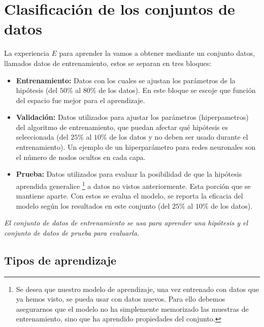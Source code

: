 \section{Clasificación de los conjuntos de datos}

La experiencia \(E\) para aprender la vamos a obtener mediante un conjunto datos, llamados datos de entrenamiento, estos se separan en tres bloques:

\begin{itemize}
 \item \textbf{Entrenamiento:} Datos con los cuales se ajustan los parámetros de la hipótesis (del \(50\%\) al \(80\%\) de los datos). En este bloque se escoje que función del espacio fue mejor para el aprendizaje.
 
 \item \textbf{Validación:} Datos utilizados para ajustar los parámetros (hiperpametros) del algoritmo de entrenamiento, que puedan afectar qué hipótesis es seleccionada (del \(25\%\) al \(10\%\) de los datos y no deben ser usado durante el entrenamiento). Un ejemplo de un hiperparámetro para redes neuronales son el número de nodos ocultos en cada capa.

 \item \textbf{Prueba:} Datos utilizados para evaluar la posibilidad de que la hipótesis aprendida generalice \footnote{Se desea que nuestro modelo de aprendizaje, una vez entrenado con datos que ya hemos visto, se pueda usar con datos nuevos. Para ello debemos asegurarnos que el modelo no ha simplemente memorizado las muestras de entrenamiento, sino que ha aprendido propiedades del conjunto.} a datos no vistos anteriormente. Esta porción que se mantiene aparte. Con estos se evalua el modelo, se reporta la eficacia del modelo según los resultados en este conjunto (del \(25\%\) al \(10\%\) de los datos).

\end{itemize}

\emph{El conjunto de datos de entrenamiento se usa para aprender una hipótesis y el conjunto de datos de prueba para evaluarla.}

\subsection{Tipos de aprendizaje}

